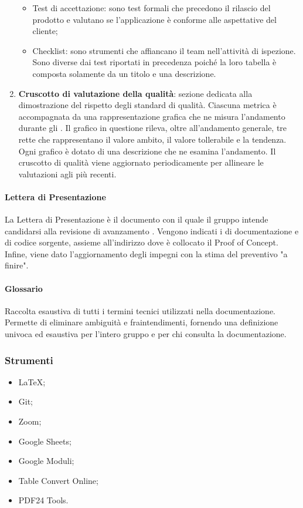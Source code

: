 \begin{enumerate}
\begin{itemize}
    \item Test di accettazione: sono test formali che precedono il rilascio del prodotto e valutano se l’applicazione è conforme alle aspettative del cliente;
    \item Checklist: sono strumenti che affiancano il team nell'attività di ispezione. Sono diverse dai test riportati in precedenza poiché la loro tabella è composta solamente da un titolo e una descrizione.
  \end{itemize}
  \item \textbf{Cruscotto di valutazione della qualità}: sezione dedicata alla dimostrazione del rispetto degli standard di qualità. Ciascuna metrica è accompagnata da una rappresentazione grafica che ne misura l'andamento durante gli . Il grafico in questione rileva, oltre all'andamento generale, tre rette che rappresentano il valore ambito, il valore tollerabile e la tendenza. Ogni grafico è dotato di una descrizione che ne esamina l'andamento. Il cruscotto di qualità viene aggiornato periodicamente per allineare le valutazioni agli  più recenti.
\end{enumerate}

\paragraph{Lettera di Presentazione}
\par La Lettera di Presentazione è il documento con il quale il gruppo intende candidarsi alla revisione di avanzamento \RTB. Vengono indicati i  di documentazione e di codice sorgente, assieme all'indirizzo dove è collocato il Proof of Concept. Infine, viene dato l'aggiornamento degli impegni con la stima del preventivo "a finire".

\paragraph{Glossario}
\par Raccolta esaustiva di tutti i termini tecnici utilizzati nella documentazione. Permette di eliminare ambiguità e fraintendimenti, fornendo una definizione univoca ed esaustiva per l'intero gruppo e per chi consulta la documentazione.

\subsubsection{Strumenti}
\IntroStrumenti
\begin{itemize}
  \item LaTeX;
  \item Git;
  \item Zoom;
  \item Google Sheets;
  \item Google Moduli;
  \item Table Convert Online;
  \item PDF24 Tools.
\end{itemize}

